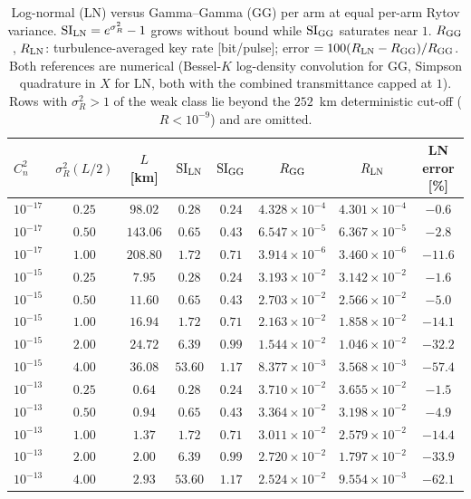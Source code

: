 \documentclass[11pt,a4paper]{article}
\theoremstyle{plain}
\theoremstyle{remark}
\begin{document}
\begin{table}[htbp]
\centering\small
\caption{Log-normal (LN) versus Gamma--Gamma (GG) per arm at equal per-arm Rytov variance. $\mathrm{SI}_{\rm LN}=e^{\sigma_R^2}-1$ grows without bound while $\mathrm{SI}_{\rm GG}$ saturates near $1$. $R_{\rm GG}$, $R_{\rm LN}$: turbulence-averaged key rate [bit/pulse]; error $=100(R_{\rm LN}-R_{\rm GG})/R_{\rm GG}$. Both references are numerical (Bessel-$K$ log-density convolution for GG, Simpson quadrature in $X$ for LN, both with the combined transmittance capped at $1$). Rows with $\sigma_R^2>1$ of the weak class lie beyond the $252$~km deterministic cut-off ($R<10^{-9}$) and are omitted.}
\label{tab:lnvsgg}
\begin{tabular}{lccccccc}
\toprule
$C_n^2$ & $\sigma_R^2(L/2)$ & $L$ [km] & $\mathrm{SI}_{\rm LN}$ & $\mathrm{SI}_{\rm GG}$ & $R_{\rm GG}$ & $R_{\rm LN}$ & LN error [\%]\\
\midrule
$10^{-17}$ & $0.25$ & $98.02$ & $0.28$ & $0.24$ & $4.328\times10^{-4}$ & $4.301\times10^{-4}$ & $-0.6$ \\
$10^{-17}$ & $0.50$ & $143.06$ & $0.65$ & $0.43$ & $6.547\times10^{-5}$ & $6.367\times10^{-5}$ & $-2.8$ \\
$10^{-17}$ & $1.00$ & $208.80$ & $1.72$ & $0.71$ & $3.914\times10^{-6}$ & $3.460\times10^{-6}$ & $-11.6$ \\
\midrule
$10^{-15}$ & $0.25$ & $7.95$ & $0.28$ & $0.24$ & $3.193\times10^{-2}$ & $3.142\times10^{-2}$ & $-1.6$ \\
$10^{-15}$ & $0.50$ & $11.60$ & $0.65$ & $0.43$ & $2.703\times10^{-2}$ & $2.566\times10^{-2}$ & $-5.0$ \\
$10^{-15}$ & $1.00$ & $16.94$ & $1.72$ & $0.71$ & $2.163\times10^{-2}$ & $1.858\times10^{-2}$ & $-14.1$ \\
$10^{-15}$ & $2.00$ & $24.72$ & $6.39$ & $0.99$ & $1.544\times10^{-2}$ & $1.046\times10^{-2}$ & $-32.2$ \\
$10^{-15}$ & $4.00$ & $36.08$ & $53.60$ & $1.17$ & $8.377\times10^{-3}$ & $3.568\times10^{-3}$ & $-57.4$ \\
\midrule
$10^{-13}$ & $0.25$ & $0.64$ & $0.28$ & $0.24$ & $3.710\times10^{-2}$ & $3.655\times10^{-2}$ & $-1.5$ \\
$10^{-13}$ & $0.50$ & $0.94$ & $0.65$ & $0.43$ & $3.364\times10^{-2}$ & $3.198\times10^{-2}$ & $-4.9$ \\
$10^{-13}$ & $1.00$ & $1.37$ & $1.72$ & $0.71$ & $3.011\times10^{-2}$ & $2.579\times10^{-2}$ & $-14.4$ \\
$10^{-13}$ & $2.00$ & $2.00$ & $6.39$ & $0.99$ & $2.720\times10^{-2}$ & $1.797\times10^{-2}$ & $-33.9$ \\
$10^{-13}$ & $4.00$ & $2.93$ & $53.60$ & $1.17$ & $2.524\times10^{-2}$ & $9.554\times10^{-3}$ & $-62.1$ \\

\bottomrule
\end{tabular}
\end{table}
\end{document}
